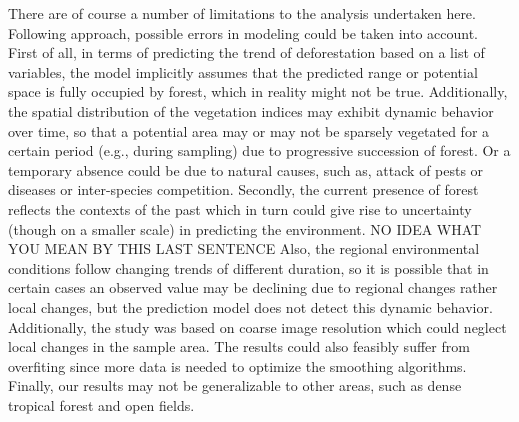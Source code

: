 There are of course a number of limitations to the analysis undertaken here. Following \citet{murase_2009} approach, possible errors in modeling could be taken into account. First of all, in terms of predicting the trend of deforestation based on a list of variables, the model implicitly assumes that the predicted range or potential space is fully occupied by forest, which in reality might not be true.  Additionally, the spatial distribution of the vegetation indices may exhibit dynamic behavior over time, so that a potential area may or may not be sparsely vegetated for a certain period (e.g., during sampling) due to progressive succession of forest. Or a temporary absence could be due to natural causes, such as, attack of pests or diseases or inter-species competition. Secondly, the current presence of forest reflects the contexts of the past which in turn could give rise to uncertainty (though on a smaller scale) in predicting the environment. NO IDEA WHAT YOU MEAN BY THIS LAST SENTENCE Also, the regional environmental conditions follow changing trends of different duration, so it is possible that in certain cases an observed value may be declining due to regional changes rather local changes, but the prediction model does not detect this dynamic behavior. Additionally, the study was based on coarse image resolution which could neglect local changes in the sample area. The results could also feasibly suffer from overfiting since more data is needed to optimize the smoothing algorithms. Finally, our results may not  be generalizable  to  other areas, such as dense tropical forest and open fields.


\let\cleardoublepage\clearpage
\begin{appendices} \label{appendix}
\renewcommand{\thechapter}{A.\arabic{chapter}}

\end{appendices}
